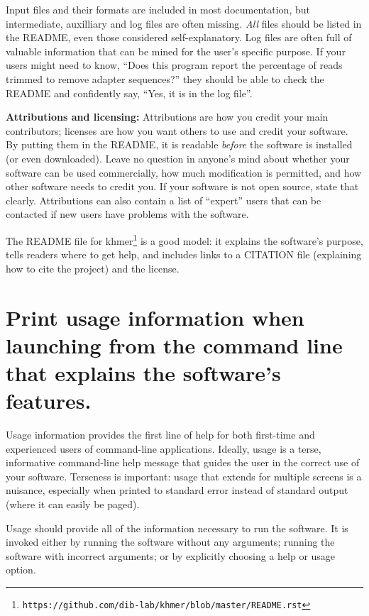 \documentclass[10pt,letterpaper]{article}
\newcommand{\withurl}[2]{{#1}\footnote{\texttt{#2}}}
\begin{document}
Input files and their formats are included in most documentation, but
intermediate, auxilliary and log files are often missing. 
\emph{All} files should be listed in the README, even those considered self-explanatory. Log
files are often full of valuable information that can be
mined for the user's specific purpose. If your users might need to know,
``Does this program report the percentage of reads trimmed to remove
adapter sequences?'' they should be able to check the README and confidently
say, ``Yes, it is in the log file''.

\textbf{Attributions and licensing:} Attributions are how you credit
your main contributors; licenses are how you want others to use and
credit your software. By putting them in the README, it is readable \emph{before}
the software is installed (or even downloaded).
Leave no
question in anyone's mind about whether your software can be used
commercially, how much modification is permitted, and how other software
needs to credit you. If your software is not open source, state that clearly.
Attributions can also contain a list of ``expert'' users
that can be contacted if new users have problems with the software.

The README file for \withurl{khmer}{https://github.com/dib-lab/khmer/blob/master/README.rst}
is a good model:
it explains the software's purpose,
tells readers where to get help,
and includes links to a CITATION file (explaining how to cite the project)
and the license.

\section{Print usage information when launching from the command line that explains the software's features.}

Usage information provides the first line of help for both first-time and
experienced users of command-line applications.
Ideally, usage is a terse, informative command-line help message that
guides the user in the correct use of your software. Terseness is
important: usage that extends for multiple screens is a nuisance, especially when
printed to standard error instead of standard output (where it can
easily be paged).

Usage should provide all of the information necessary to run the
software. It is invoked either by running the software without
any arguments; running the software with incorrect arguments; or by
explicitly choosing a help or usage option.
\end{document}
